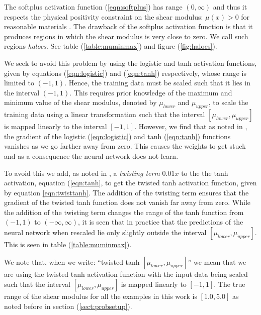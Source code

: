 \documentclass[12pt]{article}
\begin{document}
The softplus activation function (\ref{eqn:softplus}) has range $(0,\infty)$ and thus it respects the physical positivity constraint on the shear modulus: $\mu(x)>0$ for reasonable materials \cite{book:segelmathcont}. The drawback of the softplus activation function is that it produces regions in which the shear modulus is very close to zero. We call such regions \textit{haloes}. See table (\ref{table:muminmax}) and figure (\ref{fig:haloes}).

We seek to avoid this problem by using the logistic and tanh activation functions, given by equations (\ref{eqn:logistic}) and (\ref{eqn:tanh}) respectively, whose range is limited to $(-1,1)$. Hence, the training data must be scaled such that it lies in the interval $(-1,1)$. This requires prior knowledge of the maximum and minimum value of the shear modulus, denoted by $\mu_{lower}$ and $\mu_{upper}$, to scale the training data using a linear transformation such that the interval $[\mu_{lower},\mu_{upper}]$ is mapped linearly to the interval $[-1,1]$. However, we find that as noted in \cite{bookchap:lecun98b}, the gradient of the logistic (\ref{eqn:logistic}) and tanh (\ref{eqn:tanh}) functions vanishes as we go farther away from zero. This causes the weights to get stuck and as a consequence the neural network does not learn.

To avoid this we add, as noted in \cite{bookchap:lecun98b}, a \textit{twisting term} $0.01x$ to the the tanh activation, equation (\ref{eqn:tanh}, to get the twisted tanh activation function, given by equation \ref{eqn:twisttanh}. The addition of the twisting term ensures that the gradient of the twisted tanh function does not vanish far away from zero. While the addition of the twisting term changes the range of the tanh function from $(-1,1)$ to $(-\infty,\infty)$, it is seen that in practice that the predictions of the neural network when rescaled lie only slightly outside the interval $[\mu_{lower},\mu_{upper}]$. This is seen in table (\ref{table:muminmax}).

We note that, when we write: ``twisted tanh $[\mu_{lower},\mu_{upper}]$'' we mean that we are using the twisted tanh activation function with the input data being scaled such that the interval $[\mu_{lower},\mu_{upper}]$ is mapped linearly to $[-1,1]$. The true range of the shear modulus for all the examples in this work is $[1.0,5.0]$ as noted before in section (\ref{sect:probsetup}).
\end{document}
